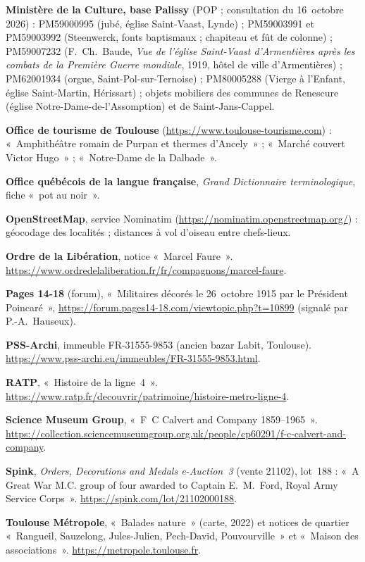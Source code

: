 \begin{biblist}
\item \textbf{Ministère de la Culture, base Palissy} (POP ; consultation du 16~octobre 2026) : PM59000995 (jubé, église Saint-Vaast, Lynde) ; PM59003991 et PM59003992 (Steenwerck, fonts baptismaux ; chapiteau et fût de colonne) ; PM59007232 (F.~Ch.~Baude, \textit{Vue de l'église Saint-Vaast d'Armentières après les combats de la Première Guerre mondiale}, 1919, hôtel de ville d'Armentières) ; PM62001934 (orgue, Saint-Pol-sur-Ternoise) ; PM80005288 (Vierge à l'Enfant, église Saint-Martin, Hérissart) ; objets mobiliers des communes de Renescure (église Notre-Dame-de-l'Assomption) et de Saint-Jans-Cappel.
\item \textbf{Office de tourisme de Toulouse} (\url{https://www.toulouse-tourisme.com}) : «~Amphithéâtre romain de Purpan et thermes d'Ancely~» ; «~Marché couvert Victor Hugo~» ; «~Notre-Dame de la Dalbade~».
\item \textbf{Office québécois de la langue française}, \textit{Grand Dictionnaire terminologique}, fiche «~pot au noir~».
\item \textbf{OpenStreetMap}, service Nominatim (\url{https://nominatim.openstreetmap.org/}) : géocodage des localités ; distances à vol d'oiseau entre chefs-lieux.
\item \textbf{Ordre de la Libération}, notice «~Marcel Faure~». \url{https://www.ordredelaliberation.fr/fr/compagnons/marcel-faure}.
\item \textbf{Pages 14-18} (forum), «~Militaires décorés le 26~octobre 1915 par le Président Poincaré~», \url{https://forum.pages14-18.com/viewtopic.php?t=10899} (signalé par P.-A.~Hauseux).
\item \textbf{PSS-Archi}, immeuble FR-31555-9853 (ancien bazar Labit, Toulouse). \url{https://www.pss-archi.eu/immeubles/FR-31555-9853.html}.
\item \textbf{RATP}, «~Histoire de la ligne~4~». \url{https://www.ratp.fr/decouvrir/patrimoine/histoire-metro-ligne-4}.
\item \textbf{Science Museum Group}, «~F~C Calvert and Company 1859--1965~». \url{https://collection.sciencemuseumgroup.org.uk/people/cp60291/f-c-calvert-and-company}.
\item \textbf{Spink}, \textit{Orders, Decorations and Medals e-Auction~3} (vente 21102), lot~188 : «~A Great War M.C. group of four awarded to Captain E.~M.~Ford, Royal Army Service Corps~». \url{https://spink.com/lot/21102000188}.
\item \textbf{Toulouse Métropole}, «~Balades nature~» (carte, 2022) et notices de quartier «~Rangueil, Sauzelong, Jules-Julien, Pech-David, Pouvourville~» et «~Maison des associations~». \url{https://metropole.toulouse.fr}.

\end{biblist}
